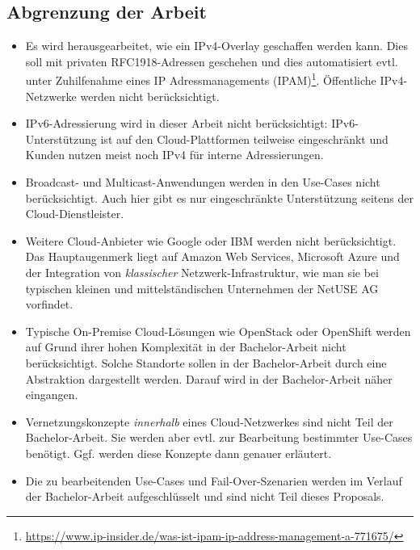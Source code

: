 \subsection{Abgrenzung der Arbeit}

\begin{itemize}
\item Es wird herausgearbeitet, wie ein IPv4-Overlay geschaffen werden kann. Dies soll mit privaten RFC1918-Adressen geschehen und dies automatisiert evtl. unter Zuhilfenahme eines IP Adressmanagements (IPAM)\footnote{\url{https://www.ip-insider.de/was-ist-ipam-ip-address-management-a-771675/}}. Öffentliche IPv4-Netzwerke werden nicht berücksichtigt.
\item IPv6-Adressierung wird in dieser Arbeit nicht berücksichtigt: IPv6-Unterstützung ist auf den Cloud-Plattformen teilweise eingeschränkt und Kunden nutzen meist noch IPv4 für interne Adressierungen.
\item Broadcast- und Multicast-Anwendungen werden in den Use-Cases nicht berücksichtigt. Auch hier gibt es nur eingeschränkte Unterstützung seitens der Cloud-Dienstleister.
\item Weitere Cloud-Anbieter wie Google oder IBM werden nicht berücksichtigt. Das Hauptaugenmerk liegt auf Amazon Web Services, Microsoft Azure und der Integration von \textit{klassischer} Netzwerk-Infrastruktur, wie man sie bei typischen kleinen und mittelständischen Unternehmen der NetUSE AG vorfindet.
\item Typische On-Premise Cloud-Lösungen wie OpenStack oder OpenShift werden auf Grund ihrer hohen Komplexität in der Bachelor-Arbeit nicht berücksichtigt. Solche Standorte sollen in der Bachelor-Arbeit durch eine Abstraktion dargestellt werden. Darauf wird in der Bachelor-Arbeit näher eingangen.
\item Vernetzungskonzepte \textit{innerhalb} eines Cloud-Netzwerkes sind nicht Teil der Bachelor-Arbeit. Sie werden aber evtl. zur Bearbeitung bestimmter Use-Cases benötigt. Ggf. werden diese Konzepte dann genauer erläutert.
\item Die zu bearbeitenden Use-Cases und Fail-Over-Szenarien werden im Verlauf der Bachelor-Arbeit aufgeschlüsselt und sind nicht Teil dieses Proposals.

\end{itemize}
